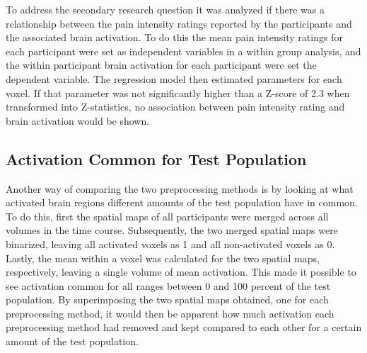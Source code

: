 To address the secondary research question it was analyzed if there was a relationship between the pain intensity ratings reported by the participants and the associated brain activation. To do this the mean pain intensity ratings for each participant were set as independent variables in a within group analysis, and the within participant brain activation for each participant were set the dependent variable. The regression model then estimated parameters for each voxel. If that parameter was not significantly higher than a Z-score of 2.3 when transformed into Z-statistics, no association between pain intensity rating and brain activation would be shown. 

\subsection{Activation Common for Test Population}
Another way of comparing the two preprocessing methods is by looking at what activated brain regions different amounts of the test population have in common. To do this, first the spatial maps of all participants were merged across all volumes in the time course. Subsequently, the two merged spatial maps were binarized, leaving all activated voxels as 1 and all non-activated voxels as 0. Lastly, the mean within a voxel was calculated for the two spatial maps, respectively, leaving a single volume of mean activation. This made it possible to see activation common for all ranges between 0 and 100 percent of the test population. By superimposing the two spatial maps obtained, one for each preprocessing method, it would then be apparent how much activation each preprocessing method had removed and kept compared to each other for a certain amount of the test population. \cite{Coghill2003}
